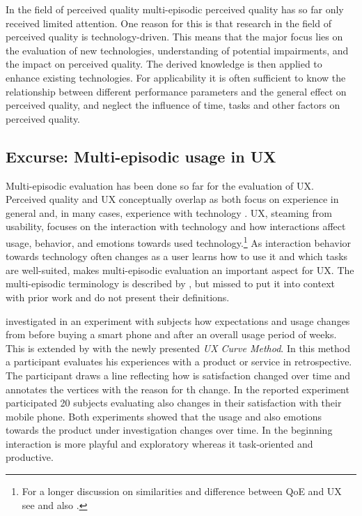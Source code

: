 In the field of perceived quality multi-episodic perceived quality has so far only received limited attention.
One reason for this is that research in the field of perceived quality is technology-driven.
This means that the major focus lies on the evaluation of new technologies, understanding of potential impairments, and the impact on perceived quality.
The derived knowledge is then applied to enhance existing technologies.
For applicability it is often sufficient to know the relationship between different performance parameters and the general effect on perceived quality, and neglect the influence of time, tasks and other factors on perceived quality.

\subsection{Excurse: Multi-episodic usage in \acl{UX}}
Multi-episodic evaluation has been done so far for the evaluation of \acf{UX}.
Perceived quality and \ac{UX} conceptually overlap as both focus on experience in general and, in many cases, experience with technology \citep[\cf][]{book chap 3}.
\ac{UX}, steaming from usability, focuses on the interaction with technology and how interactions affect usage, behavior, and emotions towards used technology.\footnote{For a longer discussion on similarities and difference between \ac{QoE} and \ac{UX} see \cite{book chapter 3} and also \cite{Hasenzahl 2008: towards user experience}.}
As interaction behavior towards technology often changes as a user learns how to use it and which tasks are well-suited, makes multi-episodic evaluation an important aspect for \ac{UX}.
The multi-episodic terminology is described by \citet[p. 8]{roto_user_2011}, but missed to put it into context with prior work and do not present their definitions.

\cite{karapanos_user_2009} investigated in an experiment with \unit[6]{subjects} how expectations and usage changes from before buying a smart phone and after an overall usage period of \unit[4]{weeks}. %
This is extended by \cite{kujala_ux_2011} with the newly presented \emph{UX Curve Method}.
In this method a participant evaluates his experiences with a product or service in retrospective.
The participant draws a line reflecting how is satisfaction changed over time and annotates the vertices with the reason for th change.
In the reported experiment participated 20 subjects evaluating also changes in their satisfaction with their mobile phone.
Both experiments showed that the usage and also emotions towards the product under investigation changes over time.
In the beginning interaction is more playful and exploratory whereas it task-oriented and productive.


